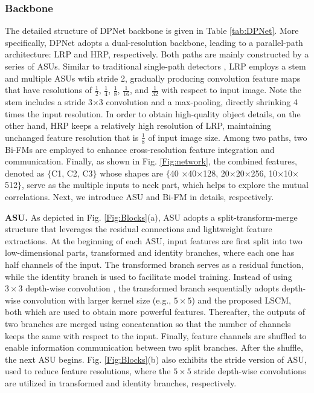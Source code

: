 \documentclass[lettersize,journal]{IEEEtran}
\begin{document}
\subsubsection{Backbone}

The detailed structure of DPNet backbone is given in Table \ref{tab:DPNet}. More specifically, DPNet adopts a dual-resolution backbone, leading to a parallel-path architecture: LRP and HRP, respectively. Both paths are mainly constructed by a series of ASUs. Similar to traditional single-path detectors \cite{qin2019thundernet,Pelee,li2018tiny}, LRP employs a stem and multiple ASUs wtih stride 2, gradually producing convolution feature maps that have resolutions of $\frac{1}{2}$, $\frac{1}{4}$, $\frac{1}{8}$, $\frac{1}{16}$, and $\frac{1}{32}$ with respect to input image. Note the stem includes a stride 3$\times $3 convolution and a max-pooling, directly shrinking 4 times the input resolution. In order to obtain high-quality object details, on the other hand, HRP keeps a relatively high resolution of LRP, maintaining unchanged feature resolution that is $\frac{1}{8}$ of input image size. Among two paths, two Bi-FMs are employed to enhance cross-resolution feature integration and communication. Finally, as shown in Fig. \ref{Fig:network}, the combined features, denoted as $\lbrace$C1, C2, C3$\rbrace$ whose shapes are $\lbrace$40 $\times$40$\times$128, 20$\times$20$\times$256, 10$\times$10$\times$512$\rbrace$, serve as the multiple inputs to neck part, which helps to explore the mutual correlations. Next, we introduce ASU and Bi-FM in details, respectively.

\noindent \textbf{ASU.} As depicted in Fig. \ref{Fig:Blocks}(a), ASU adopts a split-transform-merge structure that leverages the residual connections and lightweight feature extractions. At the beginning of each ASU, input features are first split into two low-dimensional parts, transformed and identity branches, where each one has half channels of the input. The transformed branch serves as a residual function, while the identity branch is used to facilitate model training. Instead of using $3\times3$ depth-wise convolution \cite{ma2018shufflenet}, the transformed branch sequentially adopts depth-wise convolution with larger kernel size (e.g., $5\times5$) and the proposed LSCM, both which are used to obtain more powerful features. Thereafter, the outputs of two branches are merged using concatenation so that the number of channels keeps the same with respect to the input. Finally, feature channels are shuffled to enable information communication between two split branches. After the shuffle, the next ASU begins. Fig. \ref{Fig:Blocks}(b) also exhibits the stride version of ASU, used to reduce feature resolutions, where the $5 \times 5$ stride depth-wise convolutions are utilized in transformed and identity branches, respectively.
\end{document}
